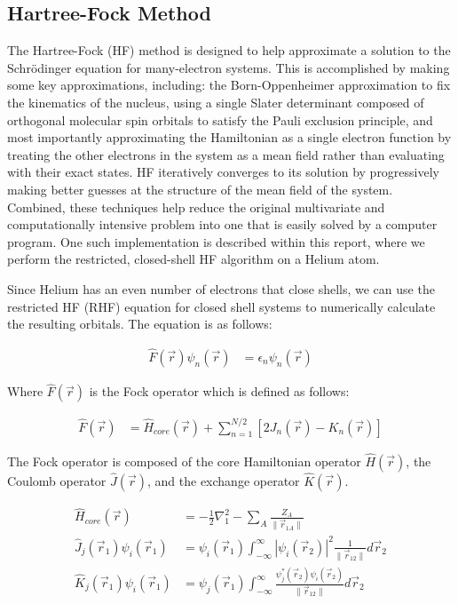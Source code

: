 \documentclass[conference, twoside]{IEEEtran}
\begin{document}
\subsection{Hartree-Fock Method} %

The Hartree-Fock (HF) method \cite{szabo-ostlund} is designed to help approximate a solution to the Schr\"{o}dinger equation for many-electron systems. This is accomplished by making some key approximations, including: the Born-Oppenheimer approximation to fix the kinematics of the nucleus, using a single Slater determinant composed of orthogonal molecular spin orbitals to satisfy the Pauli exclusion principle, and most importantly approximating the Hamiltonian as a single electron function by treating the other electrons in the system as a mean field rather than evaluating with their exact states. HF iteratively converges to its solution by progressively making better guesses at the structure of the mean field of the system. Combined, these techniques help reduce the original multivariate and computationally intensive problem into one that is easily solved by a computer program. One such implementation is described within this report, where we perform the restricted, closed-shell HF algorithm on a Helium atom.

Since Helium has an even number of electrons that close shells, we can use the restricted HF (RHF) equation for closed shell systems to numerically calculate the resulting orbitals. The equation is as follows:

\begin{align}
  \hat{F}(\vec{r})\psi_n(\vec{r}) &= \epsilon_n\psi_n(\vec{r})
\end{align}

Where $\hat{F}(\vec{r})$ is the Fock operator which is defined as follows:

\begin{align}
  \hat{F}(\vec{r}) &= \hat{H}_{core}(\vec{r}) + \sum_{n=1}^{N/2}\left[2J_n(\vec{r}) - K_n(\vec{r})\right]
\end{align}

The Fock operator is composed of the core Hamiltonian operator $\hat{H}(\vec{r})$, the Coulomb operator $\hat{J}(\vec{r})$, and the exchange operator $\hat{K}(\vec{r})$.

\begin{align}
  \hat{H}_{core}(\vec{r}) &= -\frac{1}{2}\nabla_1^2 - \sum_A\frac{Z_A}{\|\vec{r}_{1 A}\|}\\
  \hat{J}_j(\vec{r}_1)\psi_i(\vec{r}_1) &= \psi_i(\vec{r}_1)\int_{-\infty}^{\infty}\left|\psi_i(\vec{r}_2)\right|^2\frac{1}{\|\vec{r}_{12}\|}d\vec{r}_2 \\
  \hat{K}_j(\vec{r}_1)\psi_i(\vec{r}_1) &= \psi_j(\vec{r}_1)\int_{-\infty}^{\infty}\frac{\psi_j^\ast(\vec{r}_2)\psi_i(\vec{r}_2)}{\|\vec{r}_{12}\|}d\vec{r}_2
\end{align}
\end{document}
